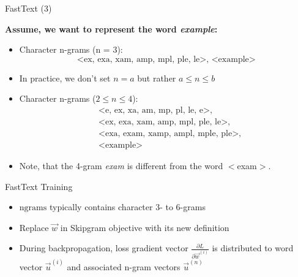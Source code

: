 
\begin{vbframe}{FastText (3)}

\vfill

\textbf{Assume, we want to represent the word \textit{example}:}

\begin{itemize}
	\item Character n-grams (n = 3):  
		$$\text{<ex, exa, xam, amp, mpl, ple, le>, <example>}$$
	\item In practice, we don't set $n = a$ but rather $a \leq n \leq b$
	\item Character n-grams ($2 \leq n \leq 4$):
  \begin{align*}
    & \text{<e, ex, xa, am, mp, pl, le, e>,} \\
    & \text{<ex, exa, xam, amp, mpl, ple, le>,} \\
    & \text{<exa, exam, xamp, ampl, mple, ple>,} \\
		& \text{<example>}
  \end{align*}
	\item Note, that the 4-gram \textit{exam} is different from the word $<$exam$>$.
\end{itemize}

\vfill

\end{vbframe}


\begin{vbframe}{FastText Training}

\vfill

\begin{itemize}
\item $\mathrm{ngrams}$ typically contains character 3- to 6-grams
\item Replace $\vec w$ in Skipgram objective with its new definition
\item During backpropagation, loss gradient vector $\frac{\partial L}{\partial \vec w^{(i)}}$ is distributed to word vector $\vec u^{(i)}$ and associated n-gram vectors $\vec u^{(n)}$
\end{itemize}

\vfill

\end{vbframe}


